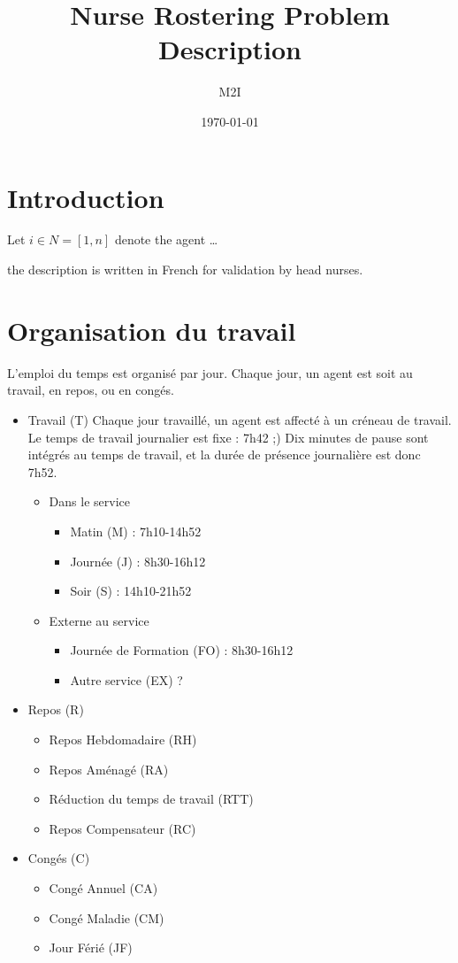 \documentclass[a4paper]{article}       %
\title{Nurse Rostering Problem Description}
\author{M2I}
\date{\today}
\begin{document}
\maketitle
\tableofcontents
\listoffixmes


\abstract{

}




\section{Introduction}

Let $i \in N=[1,n]$ denote the agent \dots


\citep{burke.ea-04}


the description is written in French for validation by head nurses.
\section*{Organisation du travail}

L'emploi du temps est organisé par jour.
Chaque jour, un agent est soit au travail, en repos, ou en congés. 
\begin{itemize}
\item Travail (T)
Chaque jour travaillé, un agent est affecté à un créneau de travail.
Le temps de travail journalier est fixe : 7h42 ;)
Dix minutes de pause sont intégrés au temps de travail, et la durée de présence journalière est donc 7h52.
\begin{itemize}
\item Dans le service
\begin{itemize}
\item Matin (M) : 7h10-14h52
\item Journée (J) : 8h30-16h12
\item Soir (S) : 14h10-21h52
\end{itemize}
\item Externe au service
\begin{itemize}
\item Journée de Formation (FO) : 8h30-16h12
\item Autre service (EX) ?
\end{itemize}
\end{itemize}
\item Repos (R)
\begin{itemize}
\item Repos Hebdomadaire (RH)
\item Repos Aménagé (RA)
\item Réduction du temps de travail (RTT)
\item Repos Compensateur (RC)
\end{itemize}
\item Congés (C)
\begin{itemize}
\item Congé Annuel (CA)
\item Congé Maladie (CM)
\item Jour Férié (JF)
\end{itemize}
\end{itemize}
\end{document}
